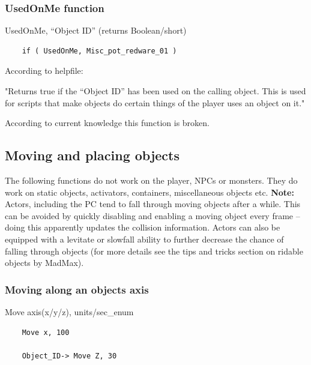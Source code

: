 

\hypertarget{usedonme-function}{%
\subsubsection{UsedOnMe function}\label{usedonme-function}}

	UsedOnMe, ``Object ID'' (returns Boolean/short)

\begin{lstlisting}	
	if ( UsedOnMe, Misc_pot_redware_01 )
\end{lstlisting}

According to helpfile:

"Returns true if the ``Object ID'' has been used on the calling object.
This is used for scripts that make objects do certain things of the
player uses an object on it."

According to current knowledge this function is broken.

\hypertarget{moving-and-placing-objects}{%
\subsection{Moving and placing
objects}\label{moving-and-placing-objects}}

The following functions do not work on the player, NPCs or monsters.
They do work on static objects, activators, containers, miscellaneous
objects etc. \textbf{Note:} Actors, including the PC tend to fall
through moving objects after a while. This can be avoided by quickly
disabling and enabling a moving object every frame -- doing this
apparently updates the collision information. Actors can also be
equipped with a levitate or slowfall ability to further decrease the
chance of falling through objects (for more details see the tips and
tricks section on ridable objects by MadMax).

\hypertarget{moving-along-an-objects-axis}{%
\subsubsection{Moving along an objects
axis}\label{moving-along-an-objects-axis}}

	Move axis(x/y/z), units/sec\_enum

\begin{lstlisting}	
	Move x, 100
	
	Object_ID-> Move Z, 30
\end{lstlisting}

